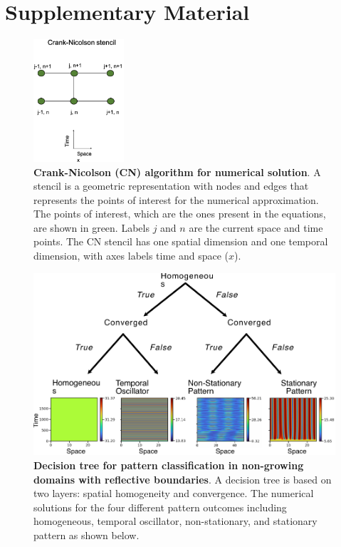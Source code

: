 \section{Supplementary Material}
\newcommand{\beginsupplement}{%
    \setcounter{table}{0}
    \renewcommand{\thetable}{S\arabic{table}}%
    \setcounter{figure}{0}
    \renewcommand{\thefigure}{S\arabic{figure}}%
}
\beginsupplement

\begin{figure}[!ht]
    \center
    \includegraphics[width=0.3\textwidth]{figures/stencils}

    \caption{\textbf{Crank-Nicolson (CN) algorithm for numerical solution}. A stencil is a geometric representation with nodes and edges that represents the points of interest for the numerical approximation. The points of interest, which are the ones present in the equations, are shown in green. Labels $j$ and $n$ are the current space and time points. The CN stencil has one spatial dimension and one temporal dimension, with axes labels time and space ($x$). }   \label{sup_fig1}
\end{figure}


\begin{figure}[!h]
    \includegraphics[width=1\textwidth]{figures/no_growth_classification}

    \caption{\textbf{Decision tree for pattern classification in non-growing domains with reflective boundaries}. A decision tree is based on two layers: spatial homogeneity and convergence. The numerical solutions for the four different pattern outcomes including  homogeneous, temporal oscillator, non-stationary, and stationary pattern as shown below.}
    \label{sup_fig2}
\end{figure}


